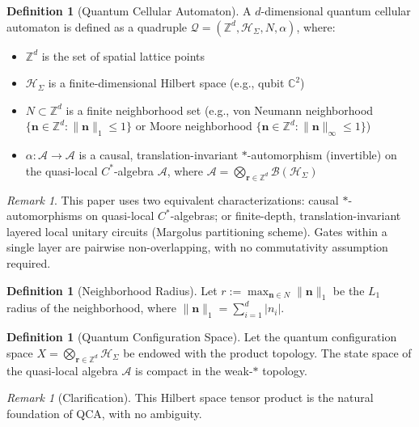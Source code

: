 \documentclass[11pt]{article}
\theoremstyle{definition}
\newtheorem{definition}[theorem]{Definition}
\theoremstyle{remark}
\newtheorem{remark}[theorem]{Remark}
\begin{document}
\begin{definition}[Quantum Cellular Automaton]\label{def:qca}
A \( d \)-dimensional quantum cellular automaton is defined as a quadruple \( \mathcal{Q} = (\mathbb{Z}^d, \mathcal{H}_\Sigma, N, \alpha) \), where:
\begin{itemize}
\item \( \mathbb{Z}^d \) is the set of spatial lattice points
\item \( \mathcal{H}_\Sigma \) is a finite-dimensional Hilbert space (e.g., qubit \( \mathbb{C}^2 \))
\item \( N \subset \mathbb{Z}^d \) is a finite neighborhood set (e.g., von Neumann neighborhood \( \{ \mathbf{n} \in \mathbb{Z}^d : \|\mathbf{n}\|_1 \le 1 \} \) or Moore neighborhood \( \{ \mathbf{n} \in \mathbb{Z}^d : \|\mathbf{n}\|_\infty \le 1 \} \))
\item \( \alpha: \mathcal{A} \to \mathcal{A} \) is a causal, translation-invariant \( * \)-automorphism (invertible) on the quasi-local \( C^* \)-algebra \( \mathcal{A} \), where \( \mathcal{A} = \bigotimes_{\mathbf{r} \in \mathbb{Z}^d} \mathcal{B}(\mathcal{H}_\Sigma) \)
\end{itemize}
\end{definition}

\begin{remark}\label{rem:2.1}
This paper uses two equivalent characterizations: causal \( * \)-automorphisms on quasi-local \( C^* \)-algebras; or finite-depth, translation-invariant layered local unitary circuits (Margolus partitioning scheme). Gates within a single layer are pairwise non-overlapping, with no commutativity assumption required.
\end{remark}

\begin{definition}[Neighborhood Radius]\label{def:qradius}
Let \( r := \max_{\mathbf{n} \in N} \|\mathbf{n}\|_1 \) be the \( L_1 \) radius of the neighborhood, where \( \|\mathbf{n}\|_1 = \sum_{i=1}^d |n_i| \).
\end{definition}

\begin{definition}[Quantum Configuration Space]\label{def:qconfig}
Let the quantum configuration space \( X = \bigotimes_{\mathbf{r} \in \mathbb{Z}^d} \mathcal{H}_\Sigma \) be endowed with the product topology. The state space of the quasi-local algebra \( \mathcal{A} \) is compact in the weak-\( * \) topology.
\end{definition}

\begin{remark}[Clarification]\label{rem:2.2}
This Hilbert space tensor product is the natural foundation of QCA, with no ambiguity.
\end{remark}
\end{document}
